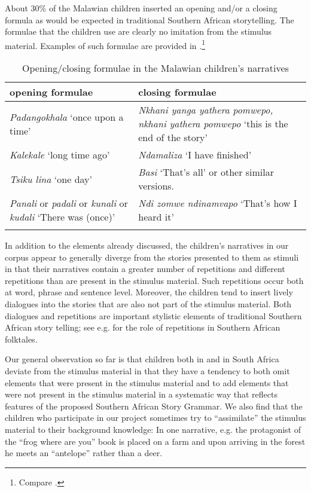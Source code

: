 \documentclass[output=paper,modfonts]{langscibook}
\begin{document}
About 30\% of the Malawian children inserted an opening and/or a closing formula as would be expected in traditional Southern African storytelling. The formulae that the children use are clearly no imitation from the stimulus material. Examples of such formulae are provided in .{}\footnote{Compare \citealt[247 and 250]{Hara2014}.}


\begin{table}
\begin{tabularx}{\textwidth}{QQ}
\lsptoprule
{\bfseries {} opening formulae} & {\bfseries {} closing formulae}\\
\midrule
{\textit{Padangokhala} `once upon a time'} & {\textit{Nkhani yanga yathera pomwepo, nkhani yathera pomwepo} `this is the end of the story'} \\
{\textit{Kalekale} `long time ago'} & {\textit{Ndamaliza} `I have finished'}\\
{\textit{Tsiku lina} `one day'} & {\textit{Basi} `That’s all' or other similar versions.}\\
{\textit{Panali} or \textit{padali} or \textit{kunali} or \textit{kudali} `There was (once)'} & {\textit{Ndi zomwe ndinamvapo} `That’s how I heard it'}\\
\lspbottomrule
\end{tabularx} 
\caption{Opening/closing formulae in the Malawian children’s narratives}
\label{tab:tappe:4}
\end{table} 

In addition to the elements already discussed, the children’s narratives in our corpus appear to generally diverge from the stories presented to them as stimuli in that their narratives contain a greater number of repetitions and different repetitions than are present in the stimulus material. Such repetitions occur both at word, phrase and sentence level. Moreover, the children tend to insert lively dialogues into the stories that are also not part of the stimulus material. Both dialogues and repetitions are important stylistic elements of traditional Southern African story telling; see e.g. \citet[218]{Obiechina1992} for the role of repetitions in Southern African folktales.

Our general observation so far is that children both in  and in South Africa deviate from the stimulus material in that they have a tendency to both omit elements that were present in the stimulus material and to add elements that were not present in the stimulus material in a systematic way that reflects features of the proposed Southern African Story Grammar. We also find that the children who participate in our project sometimes try to “assimilate” the stimulus material to their background knowledge: In one narrative, e.g. the protagonist of the “frog where are you” book is placed on a farm and upon arriving in the forest he meets an “antelope” rather than a deer.
\end{document}
